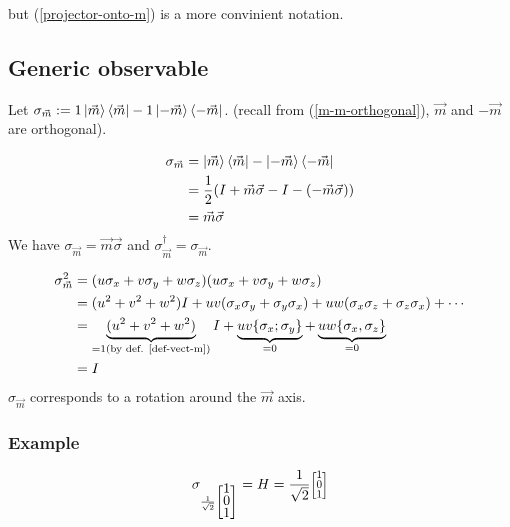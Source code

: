 \documentclass{article}
\newcommand{\colvec}[2][.8]{%
  \scalebox{#1}{%
    \renewcommand{\arraystretch}{.7}%
    $\begin{bmatrix}#2\end{bmatrix}$%
  }
}
\begin{document}
but (\ref{projector-onto-m}) is a more convinient notation.

\subsection{Generic observable}
Let $\sigma_{\vec{m}}:=1\ket{\vec{m}}\bra{\vec{m}}-1\ket{-\vec{m}}\bra{-\vec{m}}$.
(recall from (\ref{m-m-orthogonal}), $\vec{m}$ and $-\vec{m}$ are orthogonal).

\begin{equation}
    \begin{aligned}
        \sigma_{\vec{m}}
            & = \ket{\vec{m}}\bra{\vec{m}}-\ket{-\vec{m}}\bra{-\vec{m}} \\
            & = \frac{1}{2}(I+\vec{m}\vec{\sigma}-I-(-\vec{m}\vec{\sigma})) \\
            & = \vec{m}\vec{\sigma}
    \end{aligned}
\end{equation}
\noindent
We have $\sigma_{\vec{m}}=\vec{m}\vec{\sigma}$ and $\sigma_{\vec{m}}^\dagger=\sigma_{\vec{m}}$.

\begin{equation}
    \begin{aligned}
        \sigma_{\vec{m}}^2
            & = (u\sigma_x + v\sigma_y + w\sigma_z)(u\sigma_x + v\sigma_y + w\sigma_z) \\
            & = (u^2 + v^2 + w^2)I + uv (\sigma_x\sigma_y + \sigma_y\sigma_x) +
                uw (\sigma_x\sigma_z + \sigma_z\sigma_x) + \cdots \\
            & = \underbrace{(u^2 + v^2 + w^2)}_{=1 (\text{by def. \ref{def-vect-m}})}I +
                \underbrace{uv\{\sigma_x; \sigma_y\}}_{=0} + \underbrace{uw\{\sigma_x,
                \sigma_z\}}_{=0} \\
            & = I
    \end{aligned}
\end{equation}
$\sigma_{\vec{m}}$ corresponds to a rotation around the $\vec{m}$ axis.

\subsubsection*{Example}
\begin{equation}
\sigma_{\frac{1}{\sqrt{2}}\begin{bmatrix}1\\0\\1\end{bmatrix}} = H = \frac{1}{\sqrt{2}}
\colvec{1\\0\\1}
\end{equation}
\end{document}
